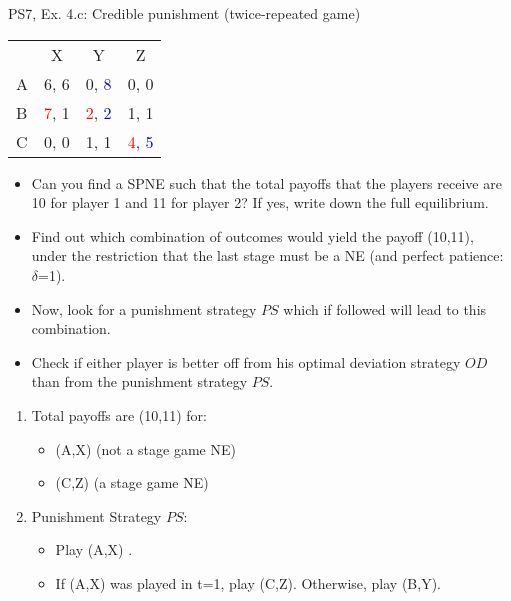 \begin{frame}{PS7, Ex. 4.c: Credible punishment (twice-repeated game)}
    \vspace{-2pt}
    \begin{table}
      \begin{tabular}{l|c|c|c|}
        \multicolumn{1}{c}{} & \multicolumn{1}{c}{X} & \multicolumn{1}{c}{Y} & \multicolumn{1}{c}{Z}\\\cline{2-4}
        A   & 6, 6 &  0, \textcolor{blue}{8} &  0, 0  \\\cline{2-4}
        B & \textcolor{red}{7}, 1  & \textcolor{red}{2}, \textcolor{blue}{2} &  1, 1  \\\cline{2-4}
        C & 0, 0  & 1, 1 &  \textcolor{red}{4}, \textcolor{blue}{5}  \\\cline{2-4}
      \end{tabular}
    \end{table}
    \vspace{-4pt}
    \begin{itemize}
        \item[(c)] Can you find a SPNE such that the total payoffs that the players receive are 10 for player 1 and 11 for player 2? If yes, write down the full equilibrium.
    \end{itemize}
    \vspace{-8pt}
    \begin{multicols}{2}
      \begin{itemize}
        \item[(Step a)] Find out which combination of outcomes would yield the payoff (10,11), under the restriction that the last stage must be a NE (and perfect patience: $\delta$=1).
        \item[(Step b)] Now, look for a punishment strategy $PS$ which if followed will lead to this combination.
        \item[(Step c)] Check if either player is better off from his optimal deviation strategy $OD$ than from the punishment strategy $PS$.
      \end{itemize}
      \vfill\null\columnbreak
      \begin{enumerate}
        \item[a.] Total payoffs are (10,11) for:
        \begin{itemize}\normalsize
          \item[t=1:] (A,X) (not a stage game NE)
          \item[t=2:] (C,Z) (a stage game NE)
        \end{itemize}
        \item[b.] Punishment Strategy $PS$:
        \begin{itemize}\normalsize
          \item[t=1:] Play (A,X) .
          \item[t=2:] If (A,X) was played in t=1, play (C,Z). Otherwise, play (B,Y).
        \end{itemize}
      \end{enumerate}
      \vfill\null
    \end{multicols}
\end{frame}

